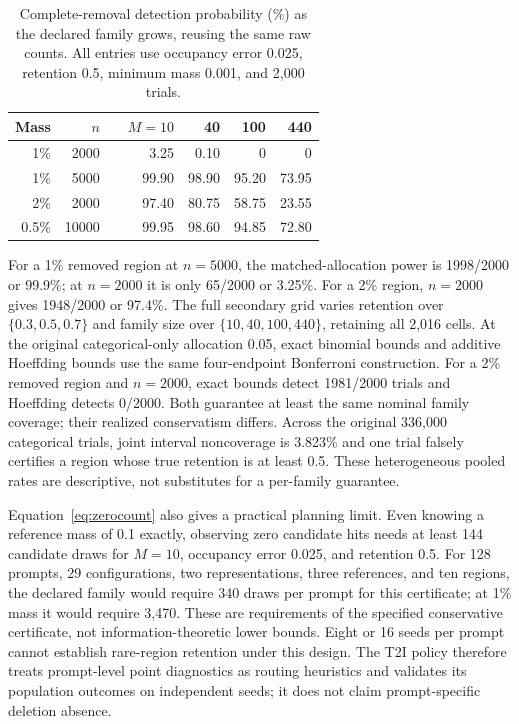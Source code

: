 \begin{table}[t]
\centering\small
\begin{tabular}{rrr rrrr}
\toprule
Mass & $n$ & & $M=10$ &40&100&440\\
\midrule
1\% &2000&&3.25&0.10&0&0\\
1\% &5000&&99.90&98.90&95.20&73.95\\
2\% &2000&&97.40&80.75&58.75&23.55\\
0.5\% &10000&&99.95&98.60&94.85&72.80\\
\bottomrule
\end{tabular}
\caption{Complete-removal detection probability (\%) as the declared family
grows, reusing the same raw counts. All entries use occupancy error 0.025,
retention 0.5, minimum mass 0.001, and 2,000 trials.}
\label{tab:support-multiplicity}
\end{table}

For a 1\% removed region at $n=5000$, the matched-allocation power is
1998/2000 or 99.9\%; at $n=2000$ it is only 65/2000 or 3.25\%.
For a 2\% region, $n=2000$ gives 1948/2000 or 97.4\%.
The full secondary grid varies retention over $\{0.3,0.5,0.7\}$ and family size
over $\{10,40,100,440\}$, retaining all 2,016 cells.
At the original categorical-only allocation 0.05, exact binomial bounds and
additive Hoeffding bounds use the same four-endpoint Bonferroni construction.
For a 2\% removed region and $n=2000$, exact bounds detect 1981/2000 trials and
Hoeffding detects 0/2000. Both guarantee at least the same nominal family
coverage; their realized conservatism differs. Across the original 336,000
categorical trials, joint interval noncoverage is 3.823\% and one trial falsely
certifies a region whose true retention is at least 0.5. These heterogeneous
pooled rates are descriptive, not substitutes for a per-family guarantee.

Equation~\ref{eq:zerocount} also gives a practical planning limit. Even knowing
a reference mass of 0.1 exactly, observing zero candidate hits needs at least
144 candidate draws for $M=10$, occupancy error 0.025, and retention 0.5.
For 128 prompts, 29 configurations, two representations, three references, and
ten regions, the declared family would require 340 draws per prompt for this
certificate; at 1\% mass it would require 3,470. These are requirements of the specified
conservative certificate, not information-theoretic lower bounds. Eight or
16 seeds per prompt cannot establish rare-region retention under this design.
The T2I policy therefore treats prompt-level point diagnostics as routing
heuristics and validates its population outcomes on independent seeds; it
does not claim prompt-specific deletion absence.

